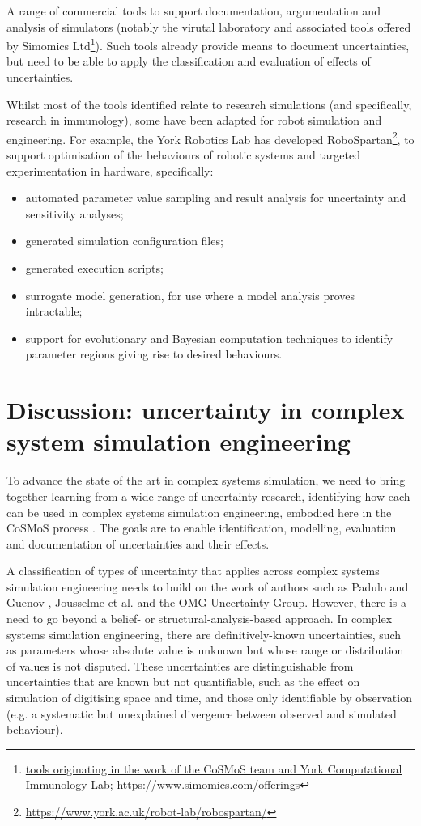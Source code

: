 \documentclass[sigconf,authordraft]{acmart}
\begin{document}
A range of commercial tools to support documentation, argumentation and analysis of simulators (notably the virutal laboratory and associated tools offered by Simomics Ltd\footnote{\url{tools originating in the work of the CoSMoS team and York Computational Immunology Lab; https://www.simomics.com/offerings}}).  Such tools already provide means to document uncertainties, but need to be able to apply the classification and evaluation of effects of uncertainties. 

Whilst most of the tools identified relate to research simulations (and specifically, research in immunology), some have been adapted for robot simulation and engineering.  For example, the York Robotics Lab has developed RoboSpartan\footnote{\url{https://www.york.ac.uk/robot-lab/robospartan/}}, to support optimisation of the behaviours of robotic systems and targeted experimentation in hardware, specifically:
\begin{itemize}
    \item automated parameter value sampling and result analysis for uncertainty and sensitivity analyses;
    \item generated simulation configuration files;
    \item generated execution scripts;
    \item surrogate model generation, for use where a model analysis proves intractable;
    \item support for evolutionary and Bayesian computation techniques to identify parameter regions giving rise to desired behaviours.
\end{itemize}




\section{Discussion: uncertainty in complex system simulation engineering}


To advance the state of the art in complex systems simulation, we need to bring together learning from a wide range of uncertainty research, identifying how each can be used in complex systems simulation engineering, embodied here in the CoSMoS process \cite{cosmosBook}.  The goals are to  enable identification, modelling, evaluation and documentation of uncertainties and their effects.  

A classification of types of uncertainty that applies across complex systems simulation engineering needs to build on the work of authors such as Padulo and Guenov \cite{unc-ced}, Jousselme et al. \cite{unc-sap} and the OMG Uncertainty Group.  However, there is a need to go beyond a belief- or structural-analysis-based approach.  In complex systems simulation engineering, there are definitively-known uncertainties, such as parameters whose absolute value is unknown but whose range or distribution of values is not disputed.  These uncertainties are distinguishable from uncertainties that are known but not quantifiable, such as the effect on simulation of digitising space and time, and those only identifiable by  observation (e.g. a systematic but unexplained divergence between observed and simulated behaviour).
\end{document}
